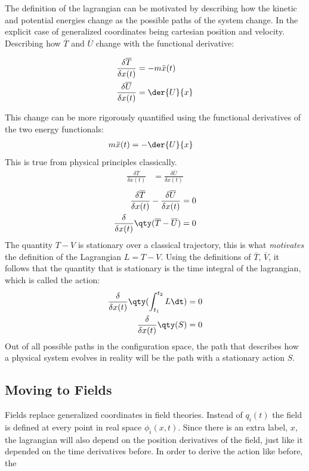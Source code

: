 The definition of the lagrangian can be motivated by describing how the kinetic and potential energies change as the possible paths of the system change. In the explicit case of generalized coordinates being cartesian position and velocity. Describing how \(\overline{T}\) and \(\overline{U}\) change with the functional derivative:

\begin{align*}
	\frac{\delta\overline{T}}{\delta x(t)}
	&=-m\ddot{x}(t)
	\\
	\frac{\delta\overline{U}}{\delta x(t)}
	&=\der{U}{x}
\end{align*}

This change can be more rigorously quantified using the functional derivatives of the two energy functionals: 
\begin{align*}
	m\ddot{x}(t)
	&=-\der{U}{x}
\end{align*}
This is true from physical principles classically.
\begin{align*}
	\frac{\delta\overline{T}}{\delta x(t)}
	&=\frac{\delta\overline{U}}{\delta x(t)}
\end{align*}
\begin{align*}
	\frac{\delta\overline{T}}{\delta x(t)}-\frac{\delta\overline{U}}{\delta x(t)}
	&=0
	\\
	\frac{\delta}{\delta x(t)}\qty(\overline{T}-\overline{U})&=0
\end{align*}
The quantity \(T-V\) is stationary over a classical trajectory, this is what \textit{motivates} the definition of the Lagrangian \(L=T-V\). Using the definitions of \(\overline{T},\,\overline{V}\), it follows that the quantity that is stationary is the time integral of the lagrangian, which is called the action:
\begin{align*}
	\frac{\delta}{\delta x(t)}\qty(\int_{t_1}^{t_2}L\dt)&=0
	\\
	\frac{\delta}{\delta x(t)}\qty(S)&=0
\end{align*}
Out of all possible paths in the configuration space, the path that describes how a physical system evolves in reality will be the path with a stationary action \(S\).


\subsection{Moving to Fields}
Fields replace generalized coordinates in field theories.
Instead of \(q_i(t)\) the field is defined at every point in real space \(\phi_i(x,t)\).
Since there is an extra label, \(x\), the lagrangian will also depend on the position derivatives of the field, just like it depended on the time derivatives before. In order to derive the action like before, the 
